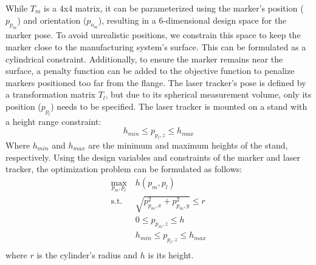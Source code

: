 \documentclass{svproc}
\begin{document}
While $T_{m}$ is a 4x4 matrix, it can be parameterized using the marker's position ($p_{p_m}$) and orientation ($p_{o_m}$), resulting in a 6-dimensional design space for the marker pose.
To avoid unrealistic positions, we constrain this space to keep the marker close to the manufacturing system's surface.
This can be formulated as a cylindrical constraint.
Additionally, to ensure the marker remains near the surface, a penalty function can be added to the objective function to penalize markers positioned too far from the flange.
The laser tracker's pose is defined by a transformation matrix $T_{l}$, but due to its spherical measurement volume, only its position ($p_{p_l}$) needs to be specified.
The laser tracker is mounted on a stand with a height range constraint:
\begin{equation}
    h_{min} \leq p_{p_l,z} \leq h_{max}
\end{equation}
Where $h_{min}$ and $h_{max}$ are the minimum and maximum heights of the stand, respectively.
Using the design variables and constraints of the marker and laser tracker, the optimization problem can be formulated as follows:
\begin{equation}
    \begin{split}
        \max_{p_m,p_l} & \ h(p_m,p_l) \\
        \text{s.t.} & \ \sqrt{p_{p_m,x}^2 + p_{p_m,y}^2} \leq r \\
        & \ 0 \leq p_{p_m,z} \leq h \\
        & \ h_{min} \leq p_{p_l,z} \leq h_{max} \\
    \end{split}
\end{equation}
where $r$ is the cylinder's radius and $h$ is its height.
\end{document}
